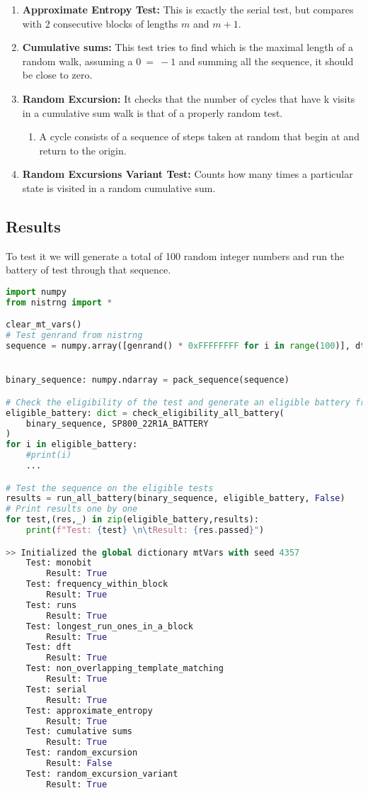 \begin{enumerate}
\item  \textbf{Approximate Entropy Test: }This is exactly the serial test, but compares with 2 consecutive blocks of lengths $m$ and $m+1$.

\item \textbf{ Cumulative sums: }This test tries to find which is the maximal length of a random walk, assuming a $0\ =\ -1$ and summing all the sequence, it should be close to zero.

\item \textbf{ Random Excursion: }It checks that the number of cycles that have k visits in a cumulative sum walk is that of a properly random test.

\begin{enumerate}
\item A cycle consists of a sequence of steps taken at random that begin at and return to the origin.
\end{enumerate}

\item \textbf{ Random Excursions Variant Test: }Counts how many times a particular state is visited in a random cumulative sum.
\end{enumerate}

\subsection{Results}
To test it we will generate a total of 100 random integer numbers and run the battery of test through that sequence.
\begin{lstlisting}[language=Python]
import numpy
from nistrng import *

clear_mt_vars()
# Test genrand from nistrng
sequence = numpy.array([genrand() * 0xFFFFFFFF for i in range(100)], dtype=numpy.uint64)


binary_sequence: numpy.ndarray = pack_sequence(sequence)

# Check the eligibility of the test and generate an eligible battery from the default NIST-sp800-22r1a battery
eligible_battery: dict = check_eligibility_all_battery(
    binary_sequence, SP800_22R1A_BATTERY
)
for i in eligible_battery:
    #print(i)
    ...

# Test the sequence on the eligible tests
results = run_all_battery(binary_sequence, eligible_battery, False)
# Print results one by one
for test,(res,_) in zip(eligible_battery,results):
    print(f"Test: {test} \n\tResult: {res.passed}")

>> Initialized the global dictionary mtVars with seed 4357
    Test: monobit 
    	Result: True
    Test: frequency_within_block 
    	Result: True
    Test: runs 
    	Result: True
    Test: longest_run_ones_in_a_block 
    	Result: True
    Test: dft 
    	Result: True
    Test: non_overlapping_template_matching 
    	Result: True
    Test: serial 
    	Result: True
    Test: approximate_entropy 
    	Result: True
    Test: cumulative sums 
    	Result: True
    Test: random_excursion 
    	Result: False
    Test: random_excursion_variant 
    	Result: True
\end{lstlisting}

